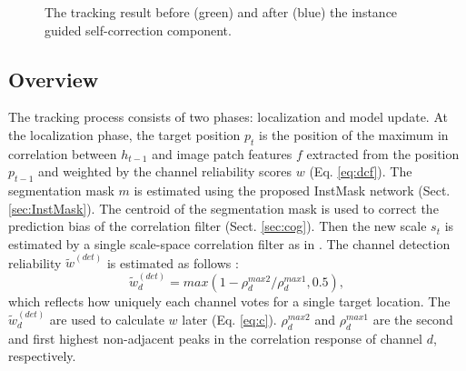\documentclass[review]{elsarticle}
\begin{document}
\begin{CJK*}{UTF8}{gbsn}
\begin{figure}
                       \hspace{-0.6em}
                       \hspace{-0.6em}
    \caption{The tracking result before (green) and after (blue) the instance guided self-correction component.}
    \label{fig:IGSC}
\end{figure}

\subsection{Overview}
The tracking process consists of two phases: localization and model update. 
At the localization phase, the target position $p_t$ is the position of the maximum in correlation between $h_{t-1}$ and image patch features $f$ extracted from the position $p_{t-1}$ and weighted by the channel reliability scores $w$ (Eq. \ref{eq:dcf}).
The segmentation mask $m$ is estimated using the proposed InstMask network (Sect. \ref{sec:InstMask}).
The centroid of the segmentation mask is used to correct the prediction bias of the correlation filter (Sect. \ref{sec:cog}).
Then the new scale $s_t$ is estimated by a single scale-space correlation filter as in \cite{Danelljan2014AccurateSE}.
The channel detection reliability $\tilde{w}^{(det)}$ is estimated as follows \cite{Lukezic2017DiscriminativeCF}:
\begin{equation} \label{eq:det}
\tilde w_d^{(det)} = max(1 - \rho_d^{max2} / \rho_d^{max1}, 0.5),
\end{equation}
which reflects how uniquely each channel votes for a single target location. The $\tilde w_d^{(det)}$ are used to calculate $w$ later (Eq. \ref{eq:c}). $\rho_d^{max2}$ and $\rho_d^{max1}$ are the second and first highest non-adjacent peaks in the correlation response of channel $d$, respectively.


\end{CJK*}
\end{document}
